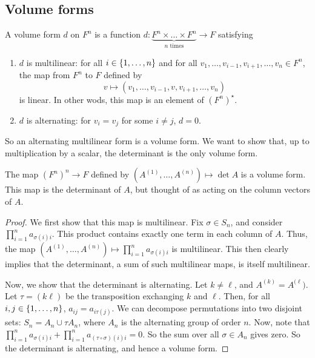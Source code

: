 \subsection{Volume forms}
\begin{definition}
	A volume form \( d \) on \( F^n \) is a function \( d \colon \underbrace{F^n \times \dots \times F^n}_{n \text{ times}} \to F \) satisfying
	\begin{enumerate}
		\item \( d \) is multilinear: for all \( i \in \qty{1, \dots, n} \) and for all \( v_1, \dots, v_{i-1}, v_{i+1}, \dots, v_n \in F^n \), the map from \( F^n \) to \( F \) defined by
		      \[
			      v \mapsto (v_1, \dots, v_{i-1}, v, v_{i+1}, \dots, v_n)
		      \]
		      is linear.
		      In other wods, this map is an element of \( (F^n)^\star \).
		\item \( d \) is alternating: for \( v_i = v_j \) for some \( i \neq j \), \( d = 0 \).
	\end{enumerate}
	So an alternating multilinear form is a volume form.
	We want to show that, up to multiplication by a scalar, the determinant is the only volume form.
\end{definition}
\begin{lemma}
	The map \( (F^n)^n \to F \) defined by \( (A^{(1)}, \dots, A^{(n)}) \mapsto \det A \) is a volume form.
	This map is the determinant of \( A \), but thought of as acting on the column vectors of \( A \).
\end{lemma}
\begin{proof}
	We first show that this map is multilinear.
	Fix \( \sigma \in S_n \), and consider \( \prod_{i=1}^n a_{\sigma(i) i} \).
	This product contains exactly one term in each column of \( A \).
	Thus, the map \( (A^{(1)}, \dots, A^{(n)}) \mapsto \prod_{i=1}^n a_{\sigma(i) i} \) is multilinear.
	This then clearly implies that the determinant, a sum of such multilinear maps, is itself multilinear.

	Now, we show that the determinant is alternating.
	Let \( k \neq \ell \), and \( A^{(k)} = A^{(\ell}) \).
	Let \( \tau = ( k \ell ) \) be the transposition exchanging \( k \) and \( \ell \).
	Then, for all \( i, j \in \qty{1, \dots, n} \), \( a_{ij} = a_{i \tau(j)} \).
	We can decompose permutations into two disjoint sets: \( S_n = A_n \cup \tau A_n \), where \( A_n \) is the alternating group of order \( n \).
	Now, note that \( \prod_{i=1}^n a_{\sigma(i) i} + \prod_{i=1}^n a_{(\tau \circ \sigma)(i) i} = 0 \).
	So the sum over all \( \sigma \in A_n \) gives zero.
	So the determinant is alternating, and hence a volume form.
\end{proof}
